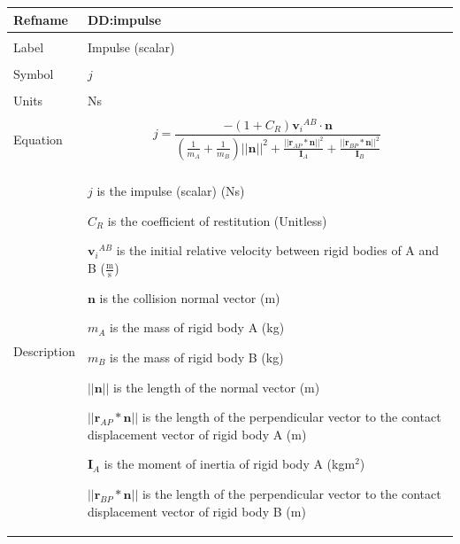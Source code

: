\documentclass[12pt]{article}
\begin{document}
\noindent \begin{minipage}{\textwidth}
\begin{tabular}{>{\raggedright}p{}>{\raggedright\arraybackslash}p{}}
\toprule \textbf{Refname} & \textbf{DD:impulse}
\label{DD:impulse}
\\ \midrule \\
Label & Impulse (scalar)
\\ \midrule \\
Symbol & $j$
\\ \midrule \\
Units & Ns
\\ \midrule \\
Equation & \begin{displaymath}
           j=\frac{-\left(1+{C_{R}}\right) {{\mathbf{v}_{i}}^{AB}}\cdot{}\mathbf{n}}{\left(\frac{1}{{m_{A}}}+\frac{1}{{m_{B}}}\right) ||\mathbf{n}||^{2}+\frac{||{\mathbf{r}_{AP}}*\mathbf{n}||^{2}}{{\mathbf{I}_{A}}}+\frac{||{\mathbf{r}_{BP}}*\mathbf{n}||^{2}}{{\mathbf{I}_{B}}}}
           \end{displaymath}
\\ \midrule \\
Description & \begin{symbDescription}
              \item{$j$ is the impulse (scalar) (Ns)}
              \item{${C_{R}}$ is the coefficient of restitution (Unitless)}
              \item{${{\mathbf{v}_{i}}^{AB}}$ is the initial relative velocity between rigid bodies of A and B ($\frac{\text{m}}{\text{s}}$)}
              \item{$\mathbf{n}$ is the collision normal vector (m)}
              \item{${m_{A}}$ is the mass of rigid body A (kg)}
              \item{${m_{B}}$ is the mass of rigid body B (kg)}
              \item{$||\mathbf{n}||$ is the length of the normal vector (m)}
              \item{$||{\mathbf{r}_{AP}}*\mathbf{n}||$ is the length of the perpendicular vector to the contact displacement vector of rigid body A (m)}
              \item{${\mathbf{I}_{A}}$ is the moment of inertia of rigid body A (kg$\text{m}^{2}$)}
              \item{$||{\mathbf{r}_{BP}}*\mathbf{n}||$ is the length of the perpendicular vector to the contact displacement vector of rigid body B (m)}

\end{symbDescription}
\end{tabular}
\end{minipage}
\end{document}
